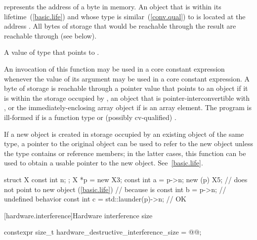\begin{itemdescr}
\pnum
\requires
{} represents the address  of a byte in memory.
An object  that is within its lifetime~(\ref{basic.life})
and whose type is similar~(\ref{conv.qual}) to 
is located at the address .
All bytes of storage that would be reachable through the result
are reachable through  (see below).

\pnum
\returns
A value of type  that points to .

\pnum
\remarks
An invocation of this function
may be used in a core constant expression
whenever the value of its argument
may be used in a core constant expression.
A byte of storage is
reachable through a pointer value
that points to an object 
if it is within the storage occupied by
,
an object that is pointer-interconvertible with , or
the immediately-enclosing array object if  is an array element.
The program is ill-formed if  is a function type
or (possibly cv-qualified) .

\pnum
\realnotes
If a new object is created
in storage occupied by an existing object of the same type,
a pointer to the original object
can be used to refer to the new object
unless the type contains  or reference members;
in the latter cases,
this function can be used to obtain a usable pointer to the new object.
See~\ref{basic.life}.

\pnum
\begin{example}
\begin{codeblock}
struct X { const int n; };
X *p = new X{3};
const int a = p->n;
new (p) X{5};                     //  does not point to new object (\ref{basic.life})
                                  // because  is 
const int b = p->n;               // undefined behavior
const int c = std::launder(p)->n; // OK
\end{codeblock}
\end{example}
\end{itemdescr}

[hardware.interference]{Hardware interference size}

%
\begin{codeblock}
constexpr size_t hardware_destructive_interference_size = @\impdef{}@;
\end{codeblock}

